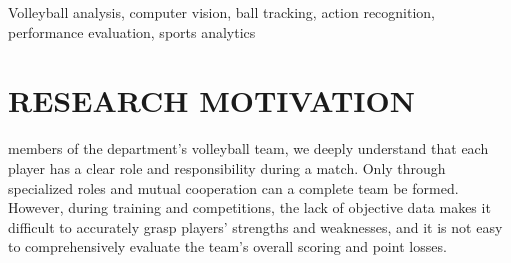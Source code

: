 \documentclass[journal]{IEEEtran}
\begin{document}
\begin{abstract}
As members of the department's volleyball team, we deeply understand that each player has a clear role and responsibility during a match. Only through specialized roles and mutual cooperation can a complete team be formed. However, during training and competitions, the lack of objective data makes it difficult to accurately grasp players' strengths and weaknesses, and it is not easy to comprehensively evaluate the team's overall scoring and point losses. Therefore, we hope to design a system that can analyze and quantify each player's on-court performance, helping individuals adjust and train to address their shortcomings, while also allowing coaches and players to better understand the team's overall performance. This research combines volleyball ball tracking using VballNet and player action recognition using YOLOv11 to create a comprehensive performance analysis system. The system tracks ball trajectories, detects landing points, and identifies key player actions including serving, attacking, blocking, receiving, and setting. Through frame-by-frame analysis, we can count the frequency and distribution of each action, providing a scientific basis for match analysis and tactical planning.
\end{abstract}

\begin{IEEEkeywords}
Volleyball analysis, computer vision, ball tracking, action recognition, performance evaluation, sports analytics
\end{IEEEkeywords}



\section{RESEARCH MOTIVATION}
 members of the department's volleyball team, we deeply understand that each player has a clear role and responsibility during a match. Only through specialized roles and mutual cooperation can a complete team be formed. However, during training and competitions, the lack of objective data makes it difficult to accurately grasp players' strengths and weaknesses, and it is not easy to comprehensively evaluate the team's overall scoring and point losses.
\end{document}
